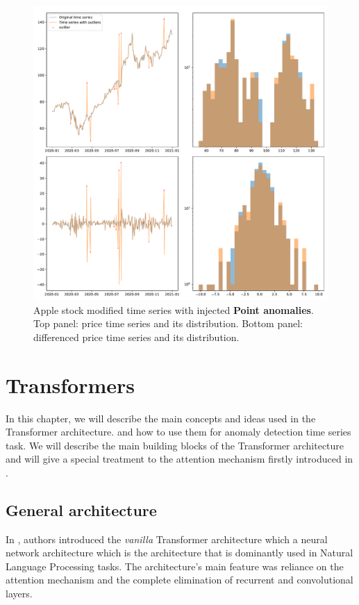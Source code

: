 \documentclass[a4paper, twoside]{report}
\theoremstyle{definition}
\numberwithin{equation}{section}
\begin{document}
\begin{figure}[h!]
    \centering
    \includegraphics[width=\textwidth]{etc/apple_outliers.pdf}
    \caption{Apple stock modified time series with injected \textbf{Point anomalies}.
        Top panel: price time series and its distribution.
        Bottom panel: differenced price time series and its distribution.}
    \label{fig:apple_time_series_outliers}
\end{figure}


\chapter{Transformers}

In this chapter, we will describe the main concepts and ideas used in the Transformer architecture.
and how to use them for anomaly detection time series task.
We will describe the main building blocks of the Transformer architecture
and will give a special treatment to the attention mechanism firstly introduced in \cite{1409.0473}.

\section{General architecture} \label{sec:general_architecture}

In \cite{1706.03762}, authors introduced the \textit{vanilla} Transformer architecture which a neural network architecture
which is the architecture that is dominantly used in Natural Language Processing tasks.
The architecture's main feature was reliance on the attention mechanism and the complete elimination
of recurrent and convolutional layers.
\end{document}
